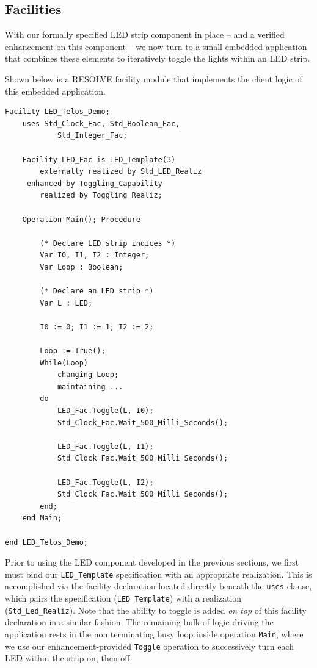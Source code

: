 \subsection{Facilities}
\label{sec:facilities}

With our formally specified LED strip component in place -- and a verified enhancement on this component -- we now turn to a small embedded application that combines these elements to iteratively toggle the lights within an LED strip.

Shown below is a RESOLVE facility module that implements the client logic of this embedded application.
\begin{verbatim}
Facility LED_Telos_Demo;
    uses Std_Clock_Fac, Std_Boolean_Fac, 
            Std_Integer_Fac;
    
    Facility LED_Fac is LED_Template(3)
        externally realized by Std_LED_Realiz
     enhanced by Toggling_Capability
        realized by Toggling_Realiz;
        
    Operation Main(); Procedure
    
        (* Declare LED strip indices *)
        Var I0, I1, I2 : Integer;
        Var Loop : Boolean;
        
        (* Declare an LED strip *)
        Var L : LED;
        
        I0 := 0; I1 := 1; I2 := 2;
        
        Loop := True();
        While(Loop)
            changing Loop;
            maintaining ...
        do
            LED_Fac.Toggle(L, I0);
            Std_Clock_Fac.Wait_500_Milli_Seconds();
            
            LED_Fac.Toggle(L, I1);
            Std_Clock_Fac.Wait_500_Milli_Seconds();
            
            LED_Fac.Toggle(L, I2);
            Std_Clock_Fac.Wait_500_Milli_Seconds();
        end;
    end Main;
    
end LED_Telos_Demo;
\end{verbatim}

Prior to using the LED component developed in the previous sections, we first must bind our \texttt{LED\_Template} specification with an appropriate realization. This is accomplished via the facility declaration located directly beneath the \texttt{uses} clause, which pairs the specification (\texttt{LED\_Template}) with a realization (\texttt{Std\_Led\_Realiz}). Note that the ability to toggle is added \textit{on top} of this facility declaration in a similar fashion. The remaining bulk of logic driving the application rests in the non terminating busy loop inside operation \texttt{Main}, where we use our enhancement-provided \texttt{Toggle} operation to successively turn each LED within the strip on, then off.

